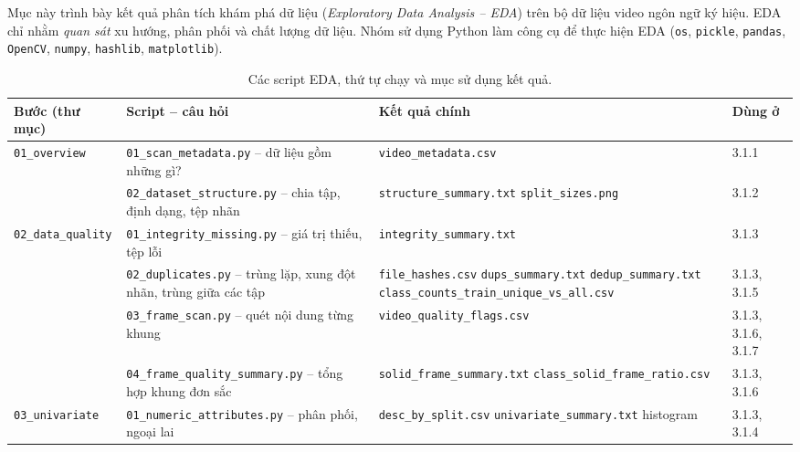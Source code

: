 Mục này trình bày kết quả phân tích khám phá dữ liệu (\textit{Exploratory Data Analysis -- EDA}) trên bộ dữ liệu video ngôn ngữ ký hiệu. EDA chỉ nhằm \emph{quan sát} xu hướng, phân phối và chất lượng dữ liệu. Nhóm sử dụng Python làm công cụ để thực hiện EDA (\texttt{os}, \texttt{pickle}, \texttt{pandas}, \texttt{OpenCV}, \texttt{numpy}, \texttt{hashlib}, \texttt{matplotlib}).
\begin{table}[H]
  \centering
  \caption{Các script EDA, thứ tự chạy và mục sử dụng kết quả.}
  \label{tab:eda_scripts}
  \small
  \begin{tabular}{@{}p{}p{}p{}p{}@{}}
    \toprule
    \textbf{Bước (thư mục)} & \textbf{Script -- câu hỏi} & \textbf{Kết quả chính} & \textbf{Dùng ở} \\
    \midrule
    \texttt{01\_overview} & \texttt{01\_scan\_metadata.py} -- dữ liệu gồm những gì? & \texttt{video\_metadata.csv} & 3.1.1 \\
      & \texttt{02\_dataset\_structure.py} -- chia tập, định dạng, tệp nhãn & \texttt{structure\_summary.txt} \newline \texttt{split\_sizes.png} & 3.1.2 \\
    \midrule
    \texttt{02\_data\_quality} & \texttt{01\_integrity\_missing.py} -- giá trị thiếu, tệp lỗi & \texttt{integrity\_summary.txt} & 3.1.3 \\
      & \texttt{02\_duplicates.py} -- trùng lặp, xung đột nhãn, trùng giữa các tập & \texttt{file\_hashes.csv} \newline \texttt{dups\_summary.txt} \newline \texttt{dedup\_summary.txt} \newline \texttt{class\_counts\_train\_unique\_vs\_all.csv} & 3.1.3, 3.1.5 \\
      & \texttt{03\_frame\_scan.py} -- quét nội dung từng khung & \texttt{video\_quality\_flags.csv} & 3.1.3, 3.1.6, 3.1.7 \\
      & \texttt{04\_frame\_quality\_summary.py} -- tổng hợp khung đơn sắc & \texttt{solid\_frame\_summary.txt} \newline \texttt{class\_solid\_frame\_ratio.csv} & 3.1.3, 3.1.6 \\
    \midrule
    \texttt{03\_univariate} & \texttt{01\_numeric\_attributes.py} -- phân phối, ngoại lai & \texttt{desc\_by\_split.csv} \newline \texttt{univariate\_summary.txt} \newline 3 histogram & 3.1.3, 3.1.4 \\

\end{tabular}
\end{table}
